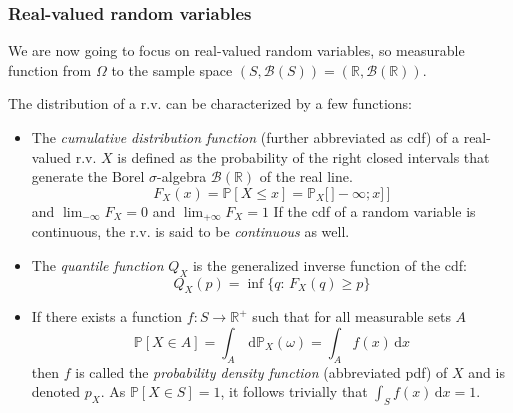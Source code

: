 \documentclass[a4paper,11pt]{article}
\newcommand{\Prob}{\mathbb{P}}
\theoremstyle{defi}
\numberwithin{thmCounter}{section}
\begin{document}
\subsubsection{Real-valued random variables}
We are now going to focus on
real-valued random variables, so measurable function from $\Omega$ to
the sample space $(S,\mathcal{B}(S)) =
(\mathbb{R},\mathcal{B}(\mathbb{R}))$.
\begin{definition}
  \label{def:distribution}
  The distribution of a r.v. can be characterized by a few functions:
  \begin{itemize}
  \item The \emph{cumulative distribution function} (further
abbreviated as cdf) of a real-valued r.v. $X$ is defined as the
probability of the right closed intervals that generate the Borel
$\sigma$-algebra $\mathcal{B}(\mathbb{R})$ of the real line.
  \begin{equation*} F_{X}(x) = \Prob\left[X \leq x\right] =
\Prob_X\big[\,]-\infty; x]\, \big]
  \end{equation*} and $\lim_{-\infty}F_X = 0$ and $\lim_{+\infty} F_X
= 1$
If the cdf of a random variable is continuous, the r.v. is said to be \emph{continuous} as well.
  
\item The \emph{quantile function} $Q_X$ is the generalized inverse function
of the cdf:
  \begin{equation*} Q_X(p) = \inf\{q:\, F_X(q)\geq p\}
  \end{equation*}
\item If there exists a function $f: S\rightarrow \mathbb{R}^{+}$ such that
  for all measurable sets $A$
  \begin{equation*} \Prob[X \in A] = \int_A \,\mathrm{d}\Prob_X(\omega) = \int_A f(x)\,\mathrm{d}x
\end{equation*}
then $f$ is called the \emph{probability density function} (abbreviated pdf) of $X$ and is denoted $p_X$.
As $\Prob[X \in S] = 1$, it follows trivially that $\int_{S}f(x)\,\mathrm{d}x=1$.


\end{itemize}
\end{definition}
\end{document}
